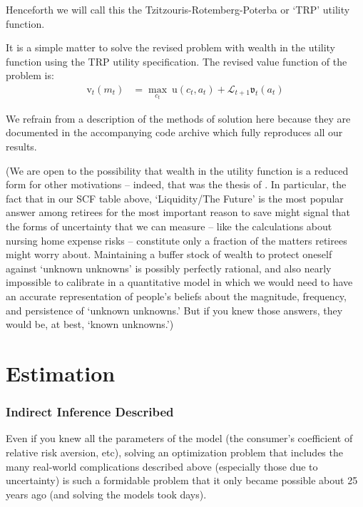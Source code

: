 \documentclass{article}
\newcommand{\uFunc}{\mathrm{u}}
\newcommand{\vFunc}{\mathrm{v}}
\newcommand{\Alive}{\mathcal{L}}
\newcommand{\cNrm}{c}
\newcommand{\aNrm}{a}
\newcommand{\mNrm}{m}
\begin{document}

Henceforth we will call this the Tzitzouris-Rotemberg-Poterba or `TRP' utility function.

It is a simple matter to solve the revised problem with wealth in the utility function using the TRP utility specification. The revised value function of the problem is:
\begin{align}
    {\vFunc}_{t}({\mNrm}_{t}) & = \max_{\cNrm_{t}} ~ \uFunc(\cNrm_{t}, \aNrm_{t})+\Alive_{t+1}\mathfrak{v}_{t}(a_{t})
\end{align}

We refrain from a description of the methods of solution here because they are documented in the accompanying code archive which fully reproduces all our results.

(We are open to the possibility that wealth in the utility function is a reduced form for other motivations -- indeed, that was the thesis of \cite{WhyDoTheRich}.  In particular, the fact that in our SCF table above, `Liquidity/The Future' is the most popular answer among retirees for the most important reason to save might signal that the forms of uncertainty that we can measure -- like the \cite{Ameriks2020jpe} calculations about nursing home expense risks -- constitute only a fraction of the matters retirees might worry about.  Maintaining a buffer stock of wealth to protect oneself against `unknown unknowns' is possibly perfectly rational, and also nearly impossible to calibrate in a quantitative model in which we would need to have an accurate representation of people's beliefs about the magnitude, frequency, and persistence of `unknown unknowns.'  But if you knew those answers, they would be, at best, `known unknowns.')

\section{Estimation}

\subsubsection{Indirect Inference Described}

Even if you knew all the parameters of the model (the consumer's coefficient of relative risk aversion, etc), solving an optimization problem that includes the many real-world complications described above (especially those due to uncertainty) is such a formidable problem that it only became possible about 25 years ago (and solving the models took days).
\end{document}
